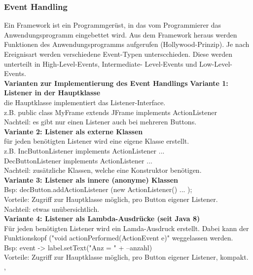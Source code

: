 \subsubsection{Event Handling}
Ein Framework ist ein Programmgerüst, in das vom Programmierer das Anwendungsprogramm eingebettet wird. Aus dem Framework heraus werden Funktionen des Anwendungsprogramms aufgerufen (Hollywood-Prinzip). 
Je nach Ereignisart werden verschiedene Event-Typen unterscchieden. Diese werden unterteilt in High-Level-Events, Intermediate-
Level-Events und Low-Level-Events. \\
\newline
\textbf{Varianten zur Implementierung des Event Handlings} 
\textbf{Variante 1: Listener in der Hauptklasse} \\
die Hauptklasse implementiert das Listener-Interface. \\
z.B. public class MyFrame extends JFrame implements ActionListener \\
Nachteil: es gibt nur einen Listener auch bei mehreren Buttons. \\
\textbf{Variante 2: Listener als externe Klassen} \\
für jeden benötigten Listener wird eine eigene Klasse erstellt.\\
z.B.  IncButtonListener implements ActionListener { ... }  \\
DecButtonListener implements ActionListener { ... } \\
Nachteil: zusätzliche Klassen, welche eine Konstruktor benötigen. \\
\textbf{Variante 3: Listener als innere (anonyme) Klassen} \\
Bsp:  decButton.addActionListener (new ActionListener() {  ...  });\\
Vorteile:    Zugriff zur Hauptklasse möglich, pro Button eigener  Listener.  \\
Nachteil:  etwas unübersichtlich. \\
\textbf{Variante 4: Listener als Lambda-Ausdrücke (seit Java 8)} \\
Für jeden benötigten Listener wird ein Lamda-Ausdruck erstellt. Dabei kann der Funktionskopf ("void actionPerformed(ActionEvent e)" weggelassen werden.\\
Bsp:   event -> label.setText("Anz = " + --anzahl) \\
Vorteile: Zugriff zur Hauptklasse möglich, pro Button eigener Listener, kompakt.
\newline
,\newline

